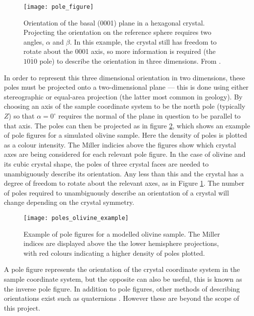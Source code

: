 \documentclass[a4paper,12pt,twoside]{report}
\numberwithin{equation}{chapter}
\begin{document}
\begin{figure}[h!]
  \centering
    \texttt{[image: pole\_figure]}
  \caption[Pole figure visualisation]{Orientation of the basal (0001) plane in a hexagonal crystal. Projecting the orientation on the reference sphere requires two angles, $\alpha$ and $\beta$. In this example, the crystal still has freedom to rotate about the 0001 axis, so more information is required (the $\mathit{10\overline{1}0}$ pole) to describe the orientation in three dimensions. From \cite{Randle2000}.}
  \label{fig:spherical_orientation}
\end{figure}



In order to represent this three dimensional orientation in two dimensions, these poles must be projected onto a two-dimensional plane --- this is done using either stereographic or equal-area projection (the latter most common in geology). By choosing an axis of the sample coordinate system to be the north pole (typically $Z$) so that $\alpha = 0^\circ$ requires the normal of the plane in question to be parallel to that axis. The poles can then be projected as in figure \ref{fig:pole_olivine_example}, which shows an example of pole figures for a simulated olivine sample. Here the density of poles is plotted as a colour intensity. The Miller indicies above the figures show which crystal axes are being considered for each relevant pole figure. In the case of olivine and its cubic crystal shape, the poles of three crystal faces are needed to unambiguously describe its orientation. Any less than this and the crystal has a degree of freedom to rotate about the relevant axes, as in Figure \ref{fig:spherical_orientation}. The number of poles required to unambiguously describe an orientation of a crystal will change depending on the crystal symmetry.




\begin{figure}[h]
  \centering
    \texttt{[image: poles\_olivine\_example]}
  \caption[Pole figure olivine example]{Example of pole figures for a modelled olivine sample. The Miller indices are displayed above the the lower hemisphere projections, with red colours indicating a higher density of poles plotted.}
  \label{fig:pole_olivine_example}
\end{figure}

A pole figure represents the orientation of the crystal coordinate system in the sample coordinate system, but the opposite can also be useful, this is known as the inverse pole figure. In addition to pole figures, other methods of describing orientations exist such as quaternions \citep{Quaternions}. However these are beyond the scope of this project. 
\end{document}
